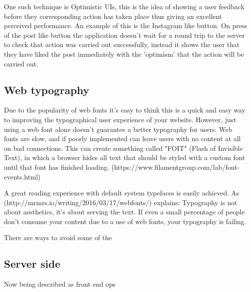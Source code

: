 One such technique is Optimistic UIs, this is the idea of showing a user feedback before they corresponding action has taken place thus giving an excellent perceived performance. An example of this is the Instagram like button. On press of the post like button the application doesn't wait for a round trip to the server to check that action was carried out successfully, instead it shows the user that they have liked the post immediately with the 'optimism' that the action will be carried out.

\subsection{Web typography}

Due to the popularity of web fonts it's easy to think this is a quick and easy way to improving the typographical user experience of your website. However, just using a web font alone doesn't guarantee a better typography for users. Web fonts are slow, and if poorly implemented can leave users with no content at all on bad connections. This can create something called "FOIT" (Flash of Invisible Text), in which a browser hides all text that should be styled with a custom font until that font has finished loading. (https://www.filamentgroup.com/lab/font-events.html)

A great reading experience with default system typefaces is easily achieved. As (http://mrmrs.io/writing/2016/03/17/webfonts/) explains: Typography is not about aesthetics, it's about serving the text. If even a small percentage of people don't consume your content due to a use of web fonts, your typography is failing.

There are ways to avoid some of the %

\subsection{Server side}

Now being described as front end ops




